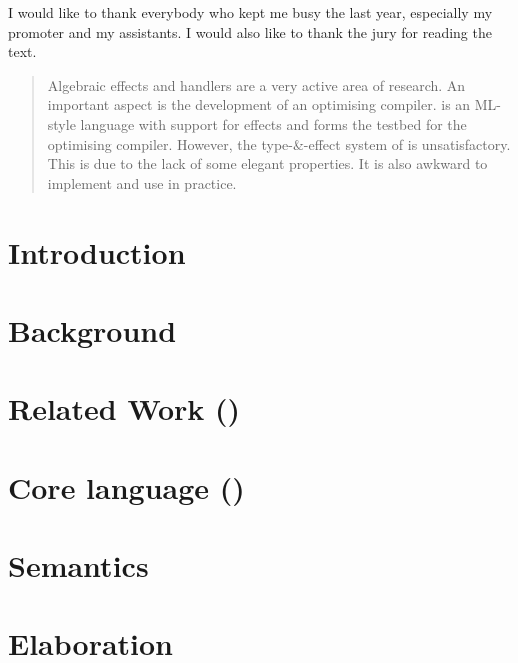 \documentclass[master=cws,masteroption=ai]{kulemt}
\begin{document}
\begin{preface}
  I would like to thank everybody who kept me busy the last year,
  especially my promoter and my assistants. I would also like to thank the
  jury for reading the text.
\end{preface}

\tableofcontents*

\begin{abstract}
  Algebraic effects and handlers are a very active area of research. An important aspect is the development of an optimising compiler. \eff is an ML-style language with support for effects and forms the testbed for the optimising compiler. However, the type-\&-effect system of \eff is unsatisfactory. This is due to the lack of some elegant properties. It is also awkward to implement and use in practice.
\end{abstract}

\listoffigures
\listoftables

\mainmatter

\chapter{Introduction}


\chapter{Background}


\chapter{Related Work (\eff)}




\chapter{Core language (\core)}




\chapter{Semantics}


\chapter{Elaboration}

\end{document}
